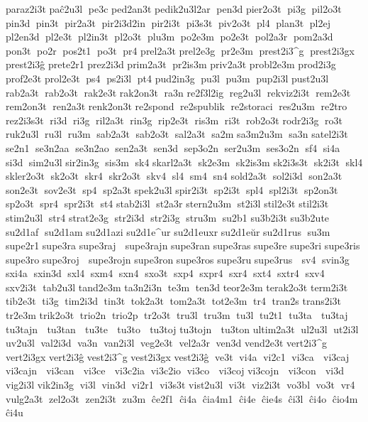  paraz2i3t 	 paĉ2u3l  pe3c 	 ped2an3t 
 pedik2u3l2ar  pen3d 	 pier2o3t  pi3g  pil2o3t  pin3d  pin3t  pir2a3t  pir2i3d2in  pir2i3t  pi3s3t  piv2o3t  pl4  plan3t  pl2ej  pl2en3d  pl2e3t  pl2in3t  pl2o3t  plu3m  po2e3m  po2e3t  pol2a3r  pom2a3d  pon3t  po2r  pos2t1  po3t  pr4 	 prel2a3t 	 prel2e3g  pr2e3m  prest2i3^g  prest2i3gx  prest2i3ĝ 	 prete2r1 	 prez2i3d 	 prim2a3t  pr2is3m 	 priv2a3t 
 probl2e3m 	 prod2i3g 	 prof2e3t 	 prol2e3t  ps4  ps2i3l  pt4 	 pud2in3g  pu3l  pu3m  pup2i3l 	 pust2u3l  rab2a3t  rab2o3t  rak2e3t 	 rak2on3t  ra3n 
 re2f3l2ig  reg2u3l  rekviz2i3t  rem2e3t 	 rem2on3t  ren2a3t 
 renk2on3t 	 re2spond  re2spublik  re2storaci  res2u3m  re2tro 
 rez2i3s3t  ri3d  ri3g  ril2a3t  rin3g  rip2e3t  ris3m  ri3t  rob2o3t 	 rodr2i3g  ro3t  ruk2u3l  ru3l  ru3m  sab2a3t  sab2o3t  sal2a3t  sa2m 	 sa3m2u3m  sa3n 
 satel2i3t  se2n1  se3n2aa  se3n2ao  sen2a3t  sen3d  sep3o2n  ser2u3m  ses3o2n  sf4  si4a  si3d  sim2u3l 	 sir2in3g  sis3m  sk4 
 skarl2a3t  sk2e3m  sk2is3m 	 sk2i3s3t  sk2i3t  skl4 
 skler2o3t  sk2o3t  skr4  skr2o3t  skv4  sl4  sm4  sn4 	 sold2a3t  sol2i3d  son2a3t  son2e3t  sov2e3t  sp4  sp2a3t 	 spek2u3l 	 spir2i3t  sp2i3t  spl4  spl2i3t  sp2on3t  sp2o3t  spr4  spr2i3t  st4 	 stab2i3l  st2a3r 
 stern2u3m  st2i3l 	 stil2e3t 	 stil2i3t 	 stim2u3l  str4 
 strat2e3g  str2i3d  str2i3g  stru3m  su2b1 	 su3b2i3t 	 su3b2ute  su2d1af  su2d1am 	 su2d1azi 
 su2d1e^ur 
 su2d1euxr 
 su2d1eŭr 	 su2d1rus  su3m  supe2r1 	 supe3ra  
 supe3raj   supe3rajn  
 supe3ran  
 supe3ras  	 supe3re  	 supe3ri  
 supe3ris  	 supe3ro  
 supe3roj   supe3rojn  
 supe3ron  
 supe3ros  	 supe3ru  
 supe3rus   sv4  svin3g  sxi4a  sxin3d  sxl4  sxm4  sxn4  sxo3t  sxp4  sxpr4  sxr4  sxt4  sxtr4  sxv4  sxv2i3t  tab2u3l 	 tand2e3m 	 ta3n2i3n  te3m  ten3d 	 teor2e3m 
 terak2o3t 	 term2i3t  tib2e3t  ti3g  tim2i3d  tin3t  tok2a3t  tom2a3t  tot2e3m  tr4  tran2s 
 trans2i3t  tr2e3m 	 trik2o3t  trio2n  trio2p  tr2o3t  tru3l  tru3m  tu3l  tu2t1  tu3ta   tu3taj  	 tu3tajn   tu3tan   tu3te   tu3to   tu3toj  	 tu3tojn   tu3ton  
 ultim2a3t  ul2u3l  ut2i3l  uv2u3l  val2i3d  va3n  van2i3l  veg2e3t  vel2a3r  ven3d 	 vend2e3t 
 vert2i3^g 
 vert2i3gx 
 vert2i3ĝ 
 vest2i3^g 
 vest2i3gx 
 vest2i3ĝ  ve3t  vi4a  vi2c1  vi3ca   vi3caj  	 vi3cajn   vi3can   vi3ce   vi3c2ia  vi3c2io  vi3co   vi3coj  	 vi3cojn   vi3con   vi3d  vig2i3l 	 vik2in3g  vi3l  vin3d  vi2r1  vi3s3t 	 vist2u3l  vi3t  viz2i3t  vo3bl  vo3t  vr4 	 vulg2a3t  zel2o3t  zen2i3t  zu3m  ĉe2f1  ĉi4a  ĉia4m1  ĉi4e  ĉie4s  ĉi3l  ĉi4o  ĉio4m  ĉi4u 

